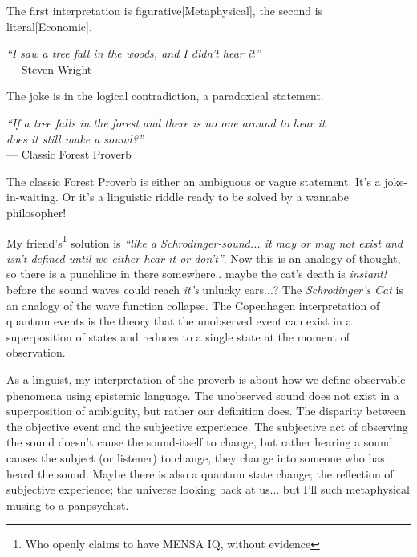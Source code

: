 \noindent
The first interpretation is figurative[Metaphysical], the second is literal[Economic].

\begin{center}
\textit{``I saw a tree fall in the woods, and I didn't hear it''}
\\ --- Steven Wright
\end{center}

\noindent
The joke is in the logical contradiction, a paradoxical statement.

\noindent
\begin{center}
\textit{``If a tree falls in the forest and there is no one around to hear it\\ does it still make a sound?''}
\\ --- Classic Forest Proverb
\end{center}

The classic Forest Proverb is either an ambiguous or vague statement. 
It's a joke-in-waiting. Or it's a linguistic riddle ready to be solved by a wannabe philosopher!


My friend's\footnote{Who openly claims to have MENSA IQ, without evidence} solution is \textit{``like a Schrodinger-sound... it may or may not exist and isn't defined until we either hear it or don't''}. Now this is an analogy of thought, so there is a punchline in there somewhere.. maybe the cat's death is \textit{instant!} before the sound waves could reach \textit{it's} unlucky ears...? The \textit{Schrodinger's Cat} is an analogy of the wave function collapse. The Copenhagen interpretation of quantum events is the theory that the unobserved event can exist in a superposition of states and reduces to a single state at the moment of observation.

As a linguist, my interpretation of the proverb is about how we define observable phenomena using epistemic language. The unobserved sound does not exist in a superposition of ambiguity, but rather our definition does. The disparity between the objective event and the subjective experience. %
The subjective act of observing the sound doesn't cause the sound-itself to change, but rather hearing a sound causes the subject (or listener) to change, they change into someone who has heard the sound. Maybe there is also a quantum state change; the reflection of subjective experience; the universe looking back at us... but I'll such metaphysical musing to a panpsychist.

